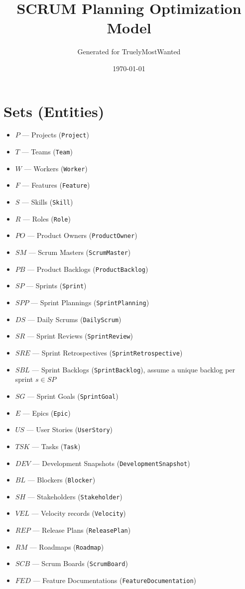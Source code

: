 \documentclass[11pt,a4paper]{article}
\title{SCRUM Planning Optimization Model}
\author{Generated for TruelyMostWanted}
\date{\today}
\begin{document}
\maketitle
\tableofcontents
\newpage

\section{Sets (Entities)}
\begin{itemize}[leftmargin=2em]
  \item $P$ — Projects (\texttt{Project})
  \item $T$ — Teams (\texttt{Team})
  \item $W$ — Workers (\texttt{Worker})
  \item $F$ — Features (\texttt{Feature})
  \item $S$ — Skills (\texttt{Skill})
  \item $R$ — Roles (\texttt{Role})
  \item $PO$ — Product Owners (\texttt{ProductOwner})
  \item $SM$ — Scrum Masters (\texttt{ScrumMaster})
  \item $PB$ — Product Backlogs (\texttt{ProductBacklog})
  \item $SP$ — Sprints (\texttt{Sprint})
  \item $SPP$ — Sprint Plannings (\texttt{SprintPlanning})
  \item $DS$ — Daily Scrums (\texttt{DailyScrum})
  \item $SR$ — Sprint Reviews (\texttt{SprintReview})
  \item $SRE$ — Sprint Retrospectives (\texttt{SprintRetrospective})
  \item $SBL$ — Sprint Backlogs (\texttt{SprintBacklog}), assume a unique backlog per sprint $s\in SP$
  \item $SG$ — Sprint Goals (\texttt{SprintGoal})
  \item $E$ — Epics (\texttt{Epic})
  \item $US$ — User Stories (\texttt{UserStory})
  \item $TSK$ — Tasks (\texttt{Task})
  \item $DEV$ — Development Snapshots (\texttt{DevelopmentSnapshot})
  \item $BL$ — Blockers (\texttt{Blocker})
  \item $SH$ — Stakeholders (\texttt{Stakeholder})
  \item $VEL$ — Velocity records (\texttt{Velocity})
  \item $REP$ — Release Plans (\texttt{ReleasePlan})
  \item $RM$ — Roadmaps (\texttt{Roadmap})
  \item $SCB$ — Scrum Boards (\texttt{ScrumBoard})
  \item $FED$ — Feature Documentations (\texttt{FeatureDocumentation})
\end{itemize}
\end{document}
